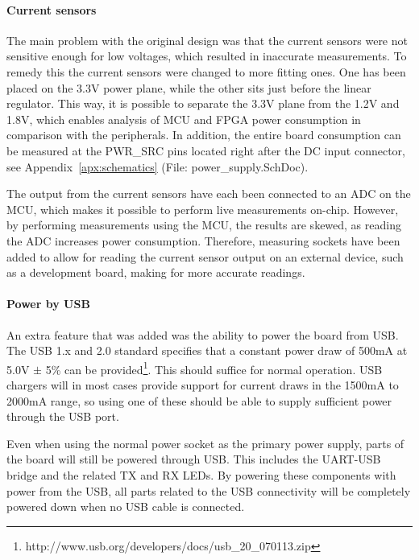 \paragraph{Current sensors} \label{psu:current_sensors}

The main problem with the original design was that the current sensors were not
sensitive enough for low voltages, which resulted in inaccurate measurements. To
remedy this the current sensors were changed to more fitting ones. One has been
placed on the 3.3V power plane, while the other sits just before the linear
regulator. This way, it is possible to separate the 3.3V plane from the 1.2V and
1.8V, which enables analysis of MCU and FPGA power consumption in comparison
with the peripherals. In addition, the entire board consumption can be measured
at the PWR\_SRC pins located right after the DC input connector, see
Appendix~\ref{apx:schematics}  (File: power\_supply.SchDoc).

The output from the current sensors have each been connected to an ADC on the
MCU, which makes it possible to perform live measurements on-chip. However, by
performing measurements using the MCU, the results are skewed, as reading the
ADC increases power consumption. Therefore, measuring sockets have been added to
allow for reading the current sensor output on an external device, such as a
development board, making for more accurate readings.

\paragraph{Power by USB} \label{psu:usb}

An extra feature that was added was the ability to power the board from USB. The
USB 1.x and 2.0 standard specifies that a constant power draw of 500mA at 5.0V
$\pm$ 5\% can be provided\footnote{
http://www.usb.org/developers/docs/usb\_20\_070113.zip}. This should suffice for
normal operation. USB chargers will in most cases provide support for current
draws in the 1500mA to 2000mA range, so using one of these should
be able to supply sufficient power through the USB port.

Even when using the normal power socket as the primary power supply, parts of
the board will still be powered through USB. This includes the UART-USB bridge
and the related TX and RX LEDs. By powering these components with power from the
USB, all parts related to the USB connectivity will be completely powered down
when no USB cable is connected.

